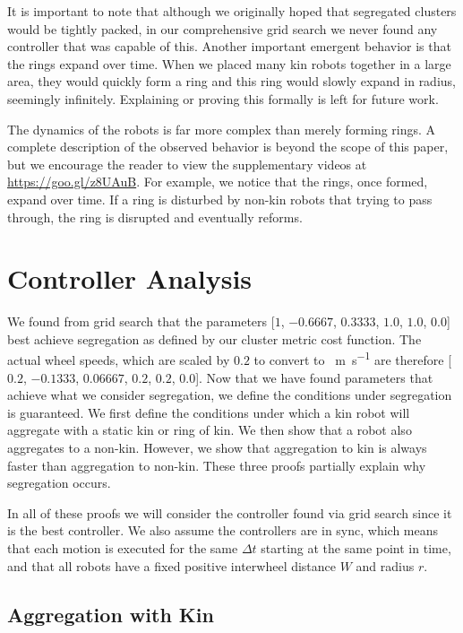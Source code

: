 \documentclass[conference]{IEEEtran}
\begin{document}
It is important to note that although we originally hoped that segregated
clusters would be tightly packed, in our comprehensive grid search we never
found any controller that was capable of this. Another important emergent
behavior is that the rings expand over time. When we placed many kin robots
together in a large area, they would quickly form a ring and this ring would
slowly expand in radius, seemingly infinitely. Explaining or proving this
formally is left for future work.

The dynamics of the robots is far more complex than merely forming rings. A
complete description of the observed behavior is beyond the scope of this paper,
but we encourage the reader to view the supplementary videos at
\href{https://www.youtube.com/playlist?list=PL9HqYJ1IkIKVX9EsT5BY9LnBsBPTjc5bB}{https://goo.gl/z8UAuB}. For
example, we notice that the rings, once formed, expand over time. If a ring is
disturbed by non-kin robots that trying to pass through, the ring is disrupted
and eventually reforms.

\section{Controller Analysis}

  We found from grid search that the parameters [$1$, $-0.6667$, $0.3333$, $1.0$, $1.0$, $0.0$] best achieve segregation as defined by our cluster metric cost function. The actual wheel speeds, which are scaled by $0.2$ to convert to \SI{}{\meter\per\second} are therefore [$0.2$, $-0.1333$, $0.06667$, $0.2$, $0.2$, $0.0$]. Now that we have found parameters that achieve what we consider segregation, we define the conditions under segregation is guaranteed. We first define the conditions under which a kin robot will aggregate with a static kin or ring of kin. We then show that a robot also aggregates to a non-kin. However, we show that aggregation to kin is always faster than aggregation to non-kin. These three proofs partially explain why segregation occurs.

  In all of these proofs we will consider the controller found via grid search since it is the best controller. We also assume the controllers are in sync, which means that each motion is executed for the same $\Delta t$ starting at the same point in time, and that all robots have a fixed positive interwheel distance $W$ and radius $r$.

  \subsection{Aggregation with Kin}
\end{document}
